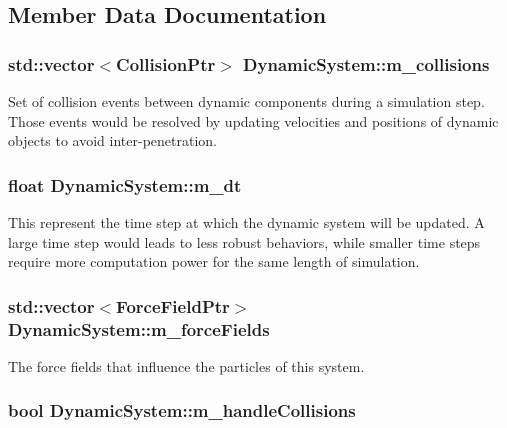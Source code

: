 \subsection{Member Data Documentation}
\hypertarget{classDynamicSystem_af59c6816c0517d44241fc85dfcd5098a}{
\subsubsection[{m\+\_\+collisions}]{\setlength{\rightskip}{0pt plus 5cm}std\+::vector$<${\bf Collision\+Ptr}$>$ Dynamic\+System\+::m\+\_\+collisions\hspace{0.3cm}{\ttfamily [private]}}}\label{classDynamicSystem_af59c6816c0517d44241fc85dfcd5098a}
Set of collision events between dynamic components during a simulation step. Those events would be resolved by updating velocities and positions of dynamic objects to avoid inter-\/penetration. \hypertarget{classDynamicSystem_a544982347cb2e35838fc33c26f3ba1a9}{
\subsubsection[{m\+\_\+dt}]{\setlength{\rightskip}{0pt plus 5cm}float Dynamic\+System\+::m\+\_\+dt\hspace{0.3cm}{\ttfamily [private]}}}\label{classDynamicSystem_a544982347cb2e35838fc33c26f3ba1a9}
This represent the time step at which the dynamic system will be updated. A large time step would leads to less robust behaviors, while smaller time steps require more computation power for the same length of simulation. \hypertarget{classDynamicSystem_ae84cfd726e249320529381e124c640d9}{
\subsubsection[{m\+\_\+force\+Fields}]{\setlength{\rightskip}{0pt plus 5cm}std\+::vector$<${\bf Force\+Field\+Ptr}$>$ Dynamic\+System\+::m\+\_\+force\+Fields\hspace{0.3cm}{\ttfamily [private]}}}\label{classDynamicSystem_ae84cfd726e249320529381e124c640d9}
The force fields that influence the particles of this system. \hypertarget{classDynamicSystem_ac0881dce496ee154df62f6d77623908d}{
\subsubsection[{m\+\_\+handle\+Collisions}]{\setlength{\rightskip}{0pt plus 5cm}bool Dynamic\+System\+::m\+\_\+handle\+Collisions\hspace{0.3cm}{\ttfamily [private]}}}\label{classDynamicSystem_ac0881dce496ee154df62f6d77623908d}
